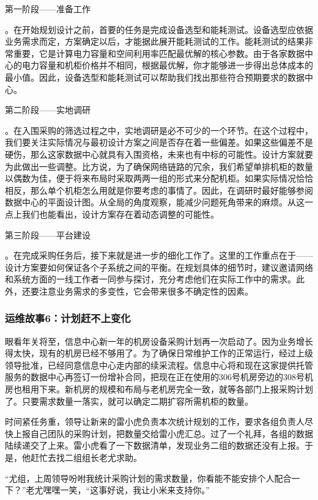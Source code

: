 \documentclass[12pt,UTF8]{ctexbook}
\begin{document}
第一阶段——准备工作

。在开始规划设计之前，首要的任务是完成设备选型和能耗测试。设备选型应依据业务需求而定，方案确定以后，才能据此展开能耗测试的工作。能耗测试的结果非常重要，它是计算电力容量和空间利用率匹配最优解的核心参数。由于各家数据中心的电力容量和机柜价格并不相同，根据最优解，你才能够进一步得出总体成本的最小值。因此，设备选型和能耗测试可以帮助我们找出那些符合预期要求的数据中心。

第二阶段——实地调研

。在入围采购的筛选过程之中，实地调研是必不可少的一个环节。在这个过程中，我们要关注实际情况与最初设计方案之间是否存在着一些偏差。如果这些偏差不是硬伤，那么这家数据中心就具有入围资格，未来也有中标的可能性。设计方案就要为此做出一些调整。比方说，为了确保网络链路的冗余，我们希望单排机柜的数量以偶数为佳，便于将来布局时采取两两一组的形式来分配机柜。如果实际情况恰恰相反，那么单个机柜怎么用就是你要考虑的事情了。因此，在调研时最好能够参阅数据中心的平面设计图。从全局的角度观察，能减少问题死角带来的麻烦。从这一点上我们也能看出，设计方案存在着动态调整的可能性。

第三阶段——平台建设

。在完成采购任务后，接下来就是进一步的细化工作了。这里的工作重点在于——设计方案要如何保证各个子系统之间的平衡。在规划具体的细节时，建议邀请网络和系统方面的一线工作者一同参与探讨，充分考虑他们在实际工作中的需求。此外，还要注意业务需求的多变性，它会带来很多不确定性的因素。

\subsubsection{运维故事6：计划赶不上变化}

眼看年关将至，信息中心新一年的机房设备采购计划再一次启动了。因为业务增长得太快，现有的机房已经不够用了。为了确保日常维护工作的正常运行，经过上级领导批准，已经同意信息中心走内部的续采流程。信息中心将和现在这家提供托管服务的数据中心再签订一份增补合同，把现在正在使用的306号机房旁边的308号机房也租用下来。新机房的规模和布局与老机房完全一致，就等各部门上报采购计划了。只要需求数量一落实，就可以确定二期扩容所需机柜的数量。

时间紧任务重，领导让新来的雷小虎负责本次统计规划的工作，要求各组负责人尽快上报自己团队的采购计划，把数量交给雷小虎汇总。过了一个礼拜，各组的数据陆续递交了上来。雷小虎看了一下数据清单，发现业务二组的数据还没有上报。于是，他赶忙去找二组组长老尤求助。

“尤组，上周领导吩咐我统计采购计划的需求数量，你看能不能安排个人配合一下？”老尤嘿嘿一笑，“这事好说，我让小米来支持你。”
\end{document}
